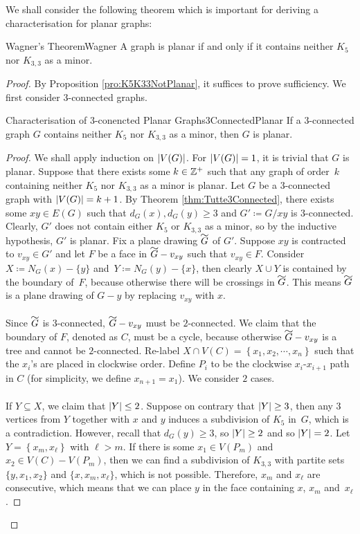 \documentclass[math]{amznotes}
\renewcommand\widetilde[1]{\ThisStyle{%
  \setbox0=\hbox{$\SavedStyle#1$}%
  \stackengine{1pt-\LMpt}{$\SavedStyle#1$}{%
    \stretchto{\scaleto{\SavedStyle\mkern.2mu\sim}{.5467\wd0}}{.5\ht0}%
  }{O}{c}{F}{T}{S}%
}}
\theoremstyle{remark}
\newcommand{\0}{\mathbf{0}}
\newcommand{\1}{\mathbf{1}}
\begin{document}
We shall consider the following theorem which is important for deriving a characterisation for planar graphs:
\begin{thmbox}{Wagner's Theorem}{Wagner}
    A graph is planar if and only if it contains neither $K_5$ nor $K_{3, 3}$ as a minor.
    \tcblower
    \begin{proof}
        By Proposition \ref{pro:K5K33NotPlanar}, it suffices to prove sufficiency. We first consider $3$-connected graphs.
        \begin{lembox}{Characterisation of $3$-conencted Planar Graphs}{3ConnectedPlanar}
            If a $3$-connected graph $G$ contains neither $K_5$ nor $K_{3, 3}$ as a minor, then $G$ is planar.
            \tcblower
            \begin{proof}
                We shall apply induction on ${\left\lvert {V(G)} \right\rvert}$. For ${\left\lvert {V(G)} \right\rvert} = 1$, it is trivial that $G$ is planar. Suppose that there exists some $k \in \mathbb{Z}^+$ such that any graph of order~$k$ containing neither $K_5$ nor $K_{3, 3}$ as a minor is planar. Let $G$ be a $3$-connected graph with ${\left\lvert {V(G)} \right\rvert} = k + 1$. By Theorem \ref{thm:Tutte3Connected}, there exists some $xy \in E(G)$ such that $d_G(x), d_G(y) \geq 3$ and $G' \coloneqq G/xy$ is $3$-connected. Clearly, $G'$ does not contain either $K_5$ or $K_{3, 3}$ as a minor, so by the inductive hypothesis, $G'$ is planar. Fix a plane drawing $\widetilde{G}$ of $G'$. Suppose $xy$ is contracted to $v_{xy} \in G'$ and let $F$ be a face in $\widetilde{G} - v_{xy}$ such that $v_{xy} \in F$. Consider $X \coloneqq N_G(x) - \{y\}$ and~$Y \coloneqq N_G(y) - \{x\}$, then clearly $X \cup Y$ is contained by the boundary of~$F$, because otherwise there will be crossings in $\widetilde{G}$. This means $\widetilde{G}$ is a plane drawing of $G - y$ by replacing $v_{xy}$ with $x$.
                \\\\ 
                Since $\widetilde{G}$ is $3$-connected, $\widetilde{G} - v_{xy}$ must be $2$-connected. We claim that the boundary of $F$, denoted as $C$, must be a cycle, because otherwise $\widetilde{G} - v_{xy}$ is a tree and cannot be $2$-connected. Re-label $X \cap V(C) = \left\{x_1, x_2, \cdots, x_n\right\}$ such that the $x_i$'s are placed in clockwise order. Define $P_i$ to be the clockwise $x_i$-$x_{i + 1}$ path in $C$ (for simplicity, we define $x_{n + 1} = x_1$). We consider $2$ cases.
                \\\\
                If $Y \subseteq X$, we claim that ${\left\lvert {Y} \right\rvert} \leq 2$. Suppose on contrary that ${\left\lvert {Y} \right\rvert} \geq 3$, then any $3$ vertices from $Y$ together with $x$ and $y$ induces a subdivision of $K_5$ in~$G$, which is a contradiction. However, recall that $d_G(y) \geq 3$, so ${\left\lvert {Y} \right\rvert} \geq 2$ and so ${\left\lvert {Y} \right\rvert} = 2$. Let $Y = \left\{x_m, x_{\ell}\right\}$ with $\ell > m$. If there is some $x_1 \in V(P_m)$ and~$x_2 \in V(C) - V(P_m)$, then we can find a subdivision of $K_{3, 3}$ with partite sets $\{y, x_1, x_2\}$ and $\{x, x_m, x_{\ell}\}$, which is not possible. Therefore, $x_m$ and $x_{\ell}$ are consecutive, which means that we can place $y$ in the face containing $x$, $x_m$ and~$x_{\ell}$.

\end{proof}
\end{lembox}
\end{proof}
\end{thmbox}
\end{document}
